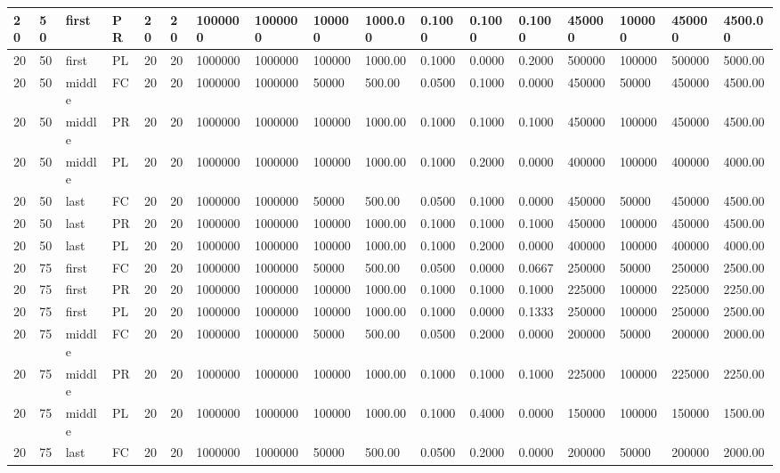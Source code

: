 \begin{tabular}{|l|l|l|l|l|l|l|l|l|l|l|l|l|l|l|l|l|}
20 & 50 & first & PR & 20 & 20 & 1000000 & 1000000 & 100000 & 1000.00 & 0.1000 & 0.1000 & 0.1000 & 450000 & 100000 & 450000 & 4500.00 \\ \hline
20 & 50 & first & PL & 20 & 20 & 1000000 & 1000000 & 100000 & 1000.00 & 0.1000 & 0.0000 & 0.2000 & 500000 & 100000 & 500000 & 5000.00 \\ \hline
20 & 50 & middle & FC & 20 & 20 & 1000000 & 1000000 & 50000 & 500.00 & 0.0500 & 0.1000 & 0.0000 & 450000 & 50000 & 450000 & 4500.00 \\ \hline
20 & 50 & middle & PR & 20 & 20 & 1000000 & 1000000 & 100000 & 1000.00 & 0.1000 & 0.1000 & 0.1000 & 450000 & 100000 & 450000 & 4500.00 \\ \hline
20 & 50 & middle & PL & 20 & 20 & 1000000 & 1000000 & 100000 & 1000.00 & 0.1000 & 0.2000 & 0.0000 & 400000 & 100000 & 400000 & 4000.00 \\ \hline
20 & 50 & last & FC & 20 & 20 & 1000000 & 1000000 & 50000 & 500.00 & 0.0500 & 0.1000 & 0.0000 & 450000 & 50000 & 450000 & 4500.00 \\ \hline
20 & 50 & last & PR & 20 & 20 & 1000000 & 1000000 & 100000 & 1000.00 & 0.1000 & 0.1000 & 0.1000 & 450000 & 100000 & 450000 & 4500.00 \\ \hline
20 & 50 & last & PL & 20 & 20 & 1000000 & 1000000 & 100000 & 1000.00 & 0.1000 & 0.2000 & 0.0000 & 400000 & 100000 & 400000 & 4000.00 \\ \hline
20 & 75 & first & FC & 20 & 20 & 1000000 & 1000000 & 50000 & 500.00 & 0.0500 & 0.0000 & 0.0667 & 250000 & 50000 & 250000 & 2500.00 \\ \hline
20 & 75 & first & PR & 20 & 20 & 1000000 & 1000000 & 100000 & 1000.00 & 0.1000 & 0.1000 & 0.1000 & 225000 & 100000 & 225000 & 2250.00 \\ \hline
20 & 75 & first & PL & 20 & 20 & 1000000 & 1000000 & 100000 & 1000.00 & 0.1000 & 0.0000 & 0.1333 & 250000 & 100000 & 250000 & 2500.00 \\ \hline
20 & 75 & middle & FC & 20 & 20 & 1000000 & 1000000 & 50000 & 500.00 & 0.0500 & 0.2000 & 0.0000 & 200000 & 50000 & 200000 & 2000.00 \\ \hline
20 & 75 & middle & PR & 20 & 20 & 1000000 & 1000000 & 100000 & 1000.00 & 0.1000 & 0.1000 & 0.1000 & 225000 & 100000 & 225000 & 2250.00 \\ \hline
20 & 75 & middle & PL & 20 & 20 & 1000000 & 1000000 & 100000 & 1000.00 & 0.1000 & 0.4000 & 0.0000 & 150000 & 100000 & 150000 & 1500.00 \\ \hline
20 & 75 & last & FC & 20 & 20 & 1000000 & 1000000 & 50000 & 500.00 & 0.0500 & 0.2000 & 0.0000 & 200000 & 50000 & 200000 & 2000.00 \\ \hline

\end{tabular}
